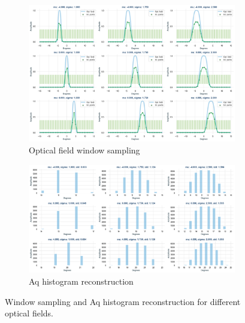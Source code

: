 \documentclass[
  letterpaper,
  DIV=11,
  numbers=noendperiod,
  oneside]{scrreprt}
\begin{document}
\begin{figure}

{\centering 

\begin{figure}

{\centering \includegraphics{notebooks/a_optical_field_files/figure-pdf/fig-2-3-histogram-output-1.png}

}

\caption{Optical field window sampling}

\end{figure}

\begin{figure}

{\centering \includegraphics{notebooks/a_optical_field_files/figure-pdf/fig-2-3-histogram-output-2.png}

}

\caption{Aq histogram reconstruction}

\end{figure}

}

\caption{\label{fig-2-3-histogram}Window sampling and Aq histogram
reconstruction for different optical fields.}

\end{figure}
\end{document}

